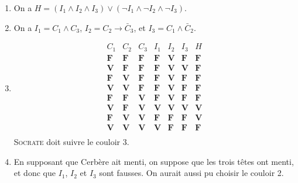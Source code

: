 \begin{enumerate}
	\item On a $H = (I_1 \land I_2 \land I_3) \lor (\lnot I_1 \land \lnot I_2\land \lnot I_3)$.
	\item On a $I_1 = C_1 \land C_3$, $I_2 = C_2 \to \bar{C}_3$, et $I_3 = C_1 \land \bar{C}_2$.
	\item \[
			\begin{array}{ccc|ccc|c}
				C_1&C_2&C_3&I_1&I_2&I_3&H\\ \hline
				\mathbf{F} & \mathbf{F} & \mathbf{F} & \mathbf{F} & \mathbf{V} & \mathbf{F} & \mathbf{F}\\
				\mathbf{V} & \mathbf{F} & \mathbf{F} & \mathbf{F} & \mathbf{V} & \mathbf{V} & \mathbf{F}\\
				\mathbf{F} & \mathbf{V} & \mathbf{F} & \mathbf{F} & \mathbf{V} & \mathbf{F} & \mathbf{F}\\
				\mathbf{V} & \mathbf{V} & \mathbf{F} & \mathbf{F} & \mathbf{V} & \mathbf{F} & \mathbf{F}\\
				\mathbf{F} & \mathbf{F} & \mathbf{V} & \mathbf{F} & \mathbf{V} & \mathbf{F} & \mathbf{F}\\
				\mathbf{V} & \mathbf{F} & \mathbf{V} & \mathbf{V} & \mathbf{V} & \mathbf{V} & \mathbf{V}\\
				\mathbf{F} & \mathbf{V} & \mathbf{V} & \mathbf{F} & \mathbf{F} & \mathbf{F} & \mathbf{V}\\
				\mathbf{V} & \mathbf{V} & \mathbf{V} & \mathbf{V} & \mathbf{F} & \mathbf{F} & \mathbf{F}\\
			\end{array}
		\] \textsc{Socrate} doit suivre le couloir 3.
	\item En supposant que Cerbère ait menti, on suppose que les trois têtes ont menti, et donc que $I_1$, $I_2$\/ et $I_3$\/ sont fausses. On aurait aussi pu choisir le couloir 2.
\end{enumerate}


